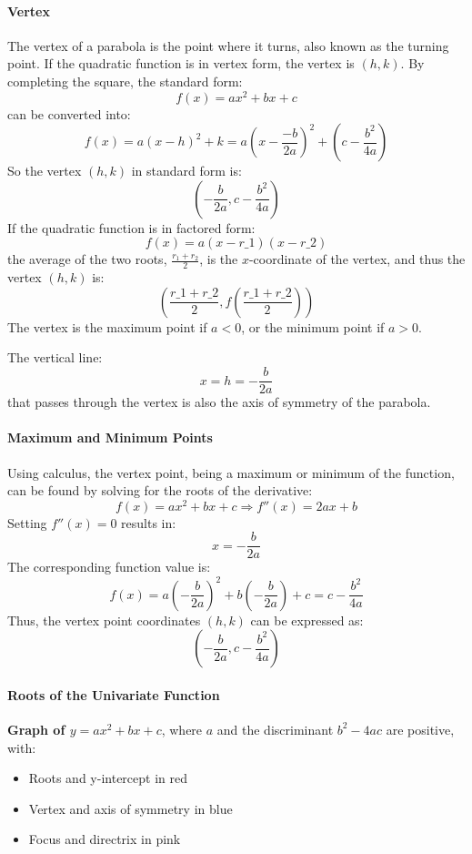 
\paragraph{Vertex}

The vertex of a parabola is the point where it turns, also known as the turning point. If the quadratic function is in vertex form, the vertex is $(h, k)$. By completing the square, the standard form:
$$
f(x) = ax^2 + bx + c
$$
can be converted into:
$$
f(x) = a(x - h)^2 + k = a\left(x - \frac{-b}{2a}\right)^2 + \left(c - \frac{b^2}{4a}\right)
$$
So the vertex $(h, k)$ in standard form is:
$$
\left(-\frac{b}{2a}, c - \frac{b^2}{4a}\right)
$$
If the quadratic function is in factored form:
$$
f(x) = a(x - r\_1)(x - r\_2)
$$
the average of the two roots, $\frac{r_1 + r_2}{2}$, is the $x$-coordinate of the vertex, and thus the vertex $(h, k)$ is:
$$
\left(\frac{r\_1 + r\_2}{2}, f\left(\frac{r\_1 + r\_2}{2}\right)\right)
$$
The vertex is the maximum point if $a < 0$, or the minimum point if $a > 0$.

The vertical line:
$$
x = h = -\frac{b}{2a}
$$
that passes through the vertex is also the axis of symmetry of the parabola.



\paragraph{Maximum and Minimum Points}

Using calculus, the vertex point, being a maximum or minimum of the function, can be found by solving for the roots of the derivative:
$$
f(x) = ax^2 + bx + c \Rightarrow f''(x) = 2ax + b
$$
Setting $f''(x) = 0$ results in:
$$
x = -\frac{b}{2a}
$$
The corresponding function value is:
$$
f(x) = a\left(-\frac{b}{2a}\right)^2 + b\left(-\frac{b}{2a}\right) + c = c - \frac{b^2}{4a}
$$
Thus, the vertex point coordinates $(h, k)$ can be expressed as:
$$
\left(-\frac{b}{2a}, c - \frac{b^2}{4a}\right)
$$
\paragraph{Roots of the Univariate Function}

\textbf{Graph of $y = ax^2 + bx + c$}, where $a$ and the discriminant $b^2 - 4ac$ are positive, with:
\begin{itemize}
    \item Roots and y-intercept in red
    \item Vertex and axis of symmetry in blue
    \item Focus and directrix in pink
\end{itemize}

